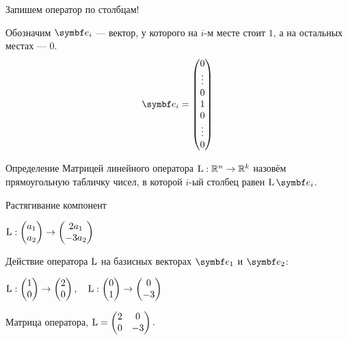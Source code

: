 \begin{frame}{Запишем оператор по столбцам!}


Обозначим $\be_i$ — вектор, у которого на $i$-м месте стоит $1$, а на остальных местах — $0$.
\[
\be_i = \begin{pmatrix}
    0 \\
    \vdots \\
    0 \\
    1 \\
    0  \\
    \vdots \\
    0 \\
\end{pmatrix}    
\]

\pause 
\begin{block}{Определение}
\alert{Матрицей линейного оператора} $\operatorname{L}: \mathbb{R}^n \to \mathbb{R}^k$ назовём прямоугольную табличку чисел, в которой $i$-ый столбец равен $\LL \be_i$. 
\end{block}
\end{frame}


\begin{frame}{Растягивание компонент}

$\operatorname{L} : \begin{pmatrix}
  a_1 \\
  a_2 \\
\end{pmatrix} \to 
\begin{pmatrix}
  2a_1 \\
  -3a_2 \\
\end{pmatrix}$

\pause

Действие оператора $\operatorname{L}$ на базисных векторах $\be_1$ и $\be_2$:

$\operatorname{L} : \begin{pmatrix}
  1 \\
  0 \\
\end{pmatrix} \to 
\begin{pmatrix}
  2 \\
  0 \\
\end{pmatrix}, \quad
\operatorname{L} : \begin{pmatrix}
  0 \\
  1 \\
\end{pmatrix} \to 
\begin{pmatrix}
  0 \\
  -3 \\
\end{pmatrix}$

\pause

Матрица оператора, $\operatorname{L} = 
\begin{pmatrix}
  2 & 0  \\
  0 & -3 \\
\end{pmatrix}.$



\end{frame}




